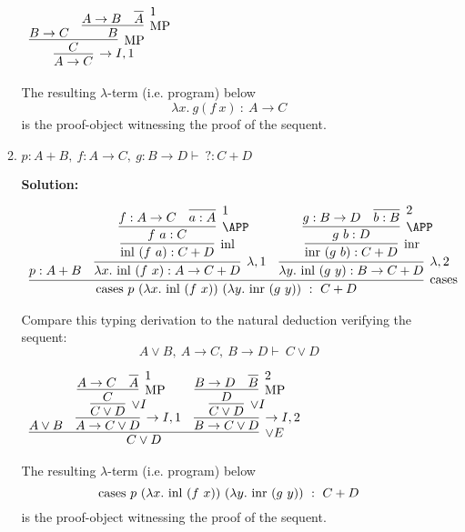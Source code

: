 \documentclass[11pt]{report}
\begin{document}
\begin{enumerate}
\begin{enumerate}
			\begin{mdframed}
				\begin{center}
					$\begin{array}{c}
						\infer[\to I,1]{A \to C}
							{\infer[\MP]{C}
								{B \to C
								&
								\infer[\MP]{B}
									{A \to B
									&
									\infer[1]{A}{}}}}
					\end{array}$
				\end{center}
			\end{mdframed}

			The resulting $\lambda$-term (i.e. program) below
			$$ \lambda x. \ g(f \ x) \ : \ A \to C$$
			is the proof-object witnessing the proof of the sequent.

			\newpage
			\item $p : A + B,\ f : A \to  C,\ g : B \to  D \vdash \ ? : C +  D$
			
			{\bf Solution:}
			\begin{mdframed}
				\begin{center}
					\footnotesize{$\begin{array}{c}
						\infer[\sumElim]{\sumElim \ p \ (\lambda x. \ \inl \ (f \ x)) \ (\lambda y. \ \inr \ (g \ y)) \ : \ C + D}
							{p : A + B
							&
							\infer[\lambda,1]{\lambda x. \ \inl \ (f \ x) : A \to C+D}
								{\infer[\inl]{\inl \ (f \ a) : C + D}
									{\infer[\APP]{f \ a : C}
										{f : A \to C
										&
										\infer[1]{a : A}
											{}}}}
							&
							\infer[\lambda,2]{\lambda y. \ \inl \ (g \ y) : B \to C+D}
								{\infer[\inr]{\inr \ (g \ b) : C + D}
									{\infer[\APP]{g \ b : D}
										{g : B \to D
										&
										\infer[2]{b : B}
											{}}}}}
					\end{array}$}
				\end{center}
			\end{mdframed}
			Compare this typing derivation to the natural deduction verifying the sequent: 
			$$A \lor B,\ A \to  C,\ B \to  D \vdash \ C \lor D$$

			\begin{mdframed}
				\begin{center}
					\footnotesize{$\begin{array}{c}
						\infer[\lor E]{C \lor D}
							{A \lor B
							&
							\infer[\to I,1]{A \to C\lor D}
								{\infer[\lor I]{C \lor D}
									{\infer[\MP]{C}
										{A \to C
										&
										\infer[1]{A}
											{}}}}
							&
							\infer[\to I,2]{B \to C\lor D}
								{\infer[\lor I]{C \lor D}
									{\infer[\MP]{D}
										{B \to D
										&
										\infer[2]{B}
											{}}}}}
					\end{array}$}
				\end{center}
			\end{mdframed}			
			The resulting $\lambda$-term (i.e. program) below
			$$\sumElim \ p \ (\lambda x. \ \inl \ (f \ x)) \ (\lambda y. \ \inr \ (g \ y)) \ : \ C + D$$
			is the proof-object witnessing the proof of the sequent.
		\end{enumerate}
	

\end{enumerate}
\end{document}
